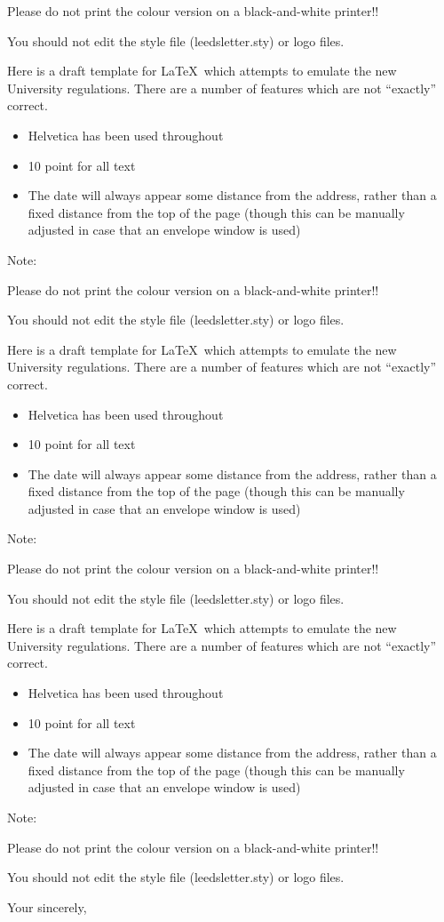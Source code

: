 \documentclass[a4paper]{letter}
\begin{document}
\begin{letter}
{Please do not print the colour version on a black-and-white printer!! 

You should not edit the style file (leedsletter.sty) or logo files. }


\medskip 
Here is a draft template for  \LaTeX\ which attempts to emulate the new University regulations.  There are a number of features which are not ``exactly'' correct. 
\begin{itemize} 
\item Helvetica has been used throughout 
\item 10 point for all text  
\item  The date will always appear some distance from the address, rather than a fixed distance from the top of the page (though this can be manually adjusted in case that  
an envelope window is used) 
\end{itemize}
Note:
{\bf 

Please do not print the colour version on a black-and-white printer!! 

You should not edit the style file (leedsletter.sty) or logo files. }


\medskip 
Here is a draft template for  \LaTeX\ which attempts to emulate the new University regulations.  There are a number of features which are not ``exactly'' correct. 
\begin{itemize} 
\item Helvetica has been used throughout 
\item 10 point for all text  
\item  The date will always appear some distance from the address, rather than a fixed distance from the top of the page (though this can be manually adjusted in case that  
an envelope window is used) 
\end{itemize}
Note:
{\bf 

Please do not print the colour version on a black-and-white printer!! 

You should not edit the style file (leedsletter.sty) or logo files. }


\medskip 
Here is a draft template for  \LaTeX\ which attempts to emulate the new University regulations.  There are a number of features which are not ``exactly'' correct. 
\begin{itemize} 
\item Helvetica has been used throughout 
\item 10 point for all text  
\item  The date will always appear some distance from the address, rather than a fixed distance from the top of the page (though this can be manually adjusted in case that  
an envelope window is used) 
\end{itemize}
Note:
{\bf 

Please do not print the colour version on a black-and-white printer!! 

You should not edit the style file (leedsletter.sty) or logo files. }
 
\closing{Your sincerely,} 
\end{letter} 
\end{document}
